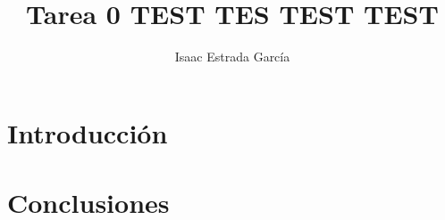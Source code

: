 \documentclass{article}
\title{Tarea 0 TEST TES TEST TEST}
\author{Isaac Estrada Garc\'{i}a }
\begin{document}
\maketitle

\section{Introducci\'{o}n}\label{intro}



\section{Conclusiones}
\end{document}
